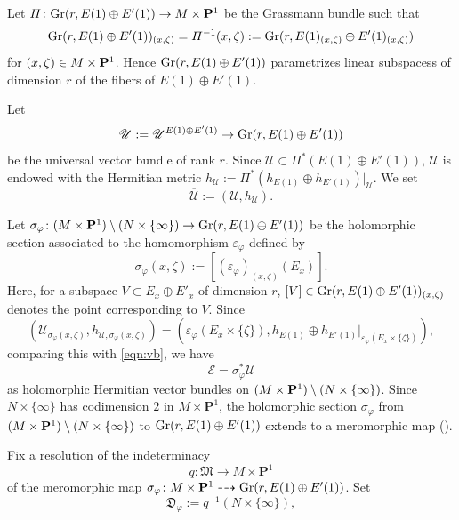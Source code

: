 \documentclass[amscd, leqno]{amsart}
\theoremstyle{plain}
\theoremstyle{definition}
\theoremstyle{remark}
\begin{document}
\par
Let $\varPi\colon{\rm Gr}(r, E(1)\oplus E'(1)) \to M\times{\bf P}^{1}$ be the Grassmann bundle such that
$$
{\rm Gr}(r, E(1)\oplus E'(1))_{(x,\zeta)} = \varPi^{-1}(x,\zeta) := {\rm Gr}(r, E(1)_{(x,\zeta)}\oplus E'(1)_{(x,\zeta)})
$$
for $(x,\zeta)\in M\times{\bf P}^{1}$. Hence ${\rm Gr}(r, E(1)\oplus E'(1))$ parametrizes linear subspacess of dimension $r$ 
of the fibers of $E(1)\oplus E'(1)$. 
\par
Let 
$$
{\mathscr U} := {\mathscr U}^{E(1)\oplus E'(1)} \to {\rm Gr}(r, E(1)\oplus E'(1))
$$ 
be the universal vector bundle of rank $r$. 
Since ${\mathscr U} \subset \varPi^{*}(E(1)\oplus E'(1))$, ${\mathscr U}$ is endowed with the Hermitian metric 
$h_{\mathscr U} := \varPi^{*}(h_{E(1)}\oplus h_{E'(1)})|_{\mathscr U}$. We set 
$$
\overline{\mathscr U} := ({\mathscr U}, h_{\mathscr U}).
$$
\par
Let $\sigma_{\varphi}\colon(M\times{\bf P}^{1})\setminus(N\times\{\infty\})\to{\rm Gr}(r, E(1)\oplus E'(1))$ be the holomorphic section 
associated to the homomorphism $\varepsilon_{\varphi}$ defined by
\begin{equation}
\label{eqn:taut:section}
\sigma_{\varphi}(x,\zeta) := [(\varepsilon_{\varphi})_{(x,\zeta)}(E_{x})].
\end{equation}
Here, for a subspace $V\subset E_{x}\oplus E'_{x}$ of dimension $r$, $[V]\in{\rm Gr}(r,E(1)\oplus E'(1))_{(x,\zeta)}$ denotes the point 
corresponding to $V$. Since
$$
( {\mathscr U}_{\sigma_{\varphi}(x,\zeta)}, h_{{\mathcal U}, \sigma_{\varphi}(x,\zeta)} )
=
( \varepsilon_{\varphi}(E_{x}\times\{\zeta\}), h_{E(1)}\oplus h_{E'(1)}|_{\varepsilon_{\varphi}(E_{x}\times\{\zeta\})} ),
$$
comparing this with \eqref{eqn:vb}, we have
$$
\overline{\mathcal E} = \sigma_{\varphi}^{*}\overline{\mathscr U}
$$
as holomorphic Hermitian vector bundles on $(M\times{\bf P}^{1})\setminus(N\times\{\infty\})$. 
Since $N\times\{\infty\}$ has codimension $2$ in $M \times {\mathbf P}^{1}$, 
the holomorphic section $\sigma_{\varphi}$ from $(M\times{\bf P}^{1})\setminus(N\times\{\infty\})$ to ${\rm Gr}(r, E(1)\oplus E'(1))$ 
extends to a meromorphic map (\cite{Siu75}).
\par
Fix a resolution of the indeterminacy 
$$
q\colon{\mathfrak M}\to M\times{\mathbf P}^{1}
$$
of the meromorphic map $\sigma_{\varphi}\colon M\times{\bf P}^{1}\dashrightarrow{\rm Gr}(r, E(1)\oplus E'(1))$. Set 
\begin{equation}
\label{eqn:divisor}
{\mathfrak D}_{\varphi} := q^{-1}(N\times\{\infty\}),
\end{equation}
\end{document}
